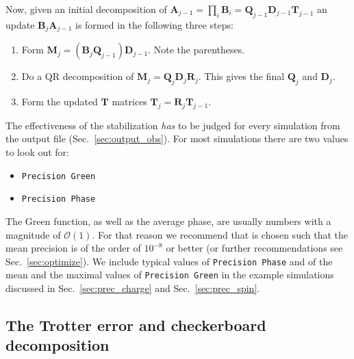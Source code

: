 Now, given an initial decomposition of $\bm{A}_{j-1} = \prod_i \mathcal{\bm{B}}_i = \bm{Q}_{j-1} \bm{D}_{j-1} \bm{T}_{j-1}$ an update
$\mathcal{\bm{B}}_j \bm{A}_{j-1}$ is formed in the following three steps:
\begin{enumerate}
\item Form $ \bm{M}_j = (\mathcal{\bm{B}}_j \bm{Q}_{j-1}) \bm{D}_{j-1}$. Note the parentheses.
\item Do a QR decomposition of $\bm{M}_j = \bm{Q}_j \bm{D}_j \bm{R}_j$. This gives the final $\bm{Q}_j$ and $\bm{D}_j$.
\item Form the updated $\bm{T}$ matrices $\bm{T}_j = \bm{R}_j \bm{T}_{j-1}$.
\end{enumerate}
The effectiveness of the stabilization \emph{has} to be judged for every simulation from the output file  (Sec.~\ref{sec:output_obs}). For most simulations there are two values to look out for:
\begin{itemize}
\item \texttt{Precision Green}
\item \texttt{Precision Phase}
\end{itemize}
The Green function, as well as the average phase, are usually numbers with a magnitude of $\mathcal{O} (1)$. 
For that reason we recommend that  is chosen such that the mean precision is of the order of $10^{-8}$ or better (or further recommendations see Sec.~\ref{sec:optimize}).
We include typical values of \texttt{Precision Phase} and of the mean and the maximal values of \texttt{Precision Green} in the example simulations discussed in Sec.~\ref{sec:prec_charge} and Sec.~\ref{sec:prec_spin}.


\subsection{The Trotter error and  checkerboard  decomposition }\label{sec:hermitian}
%

